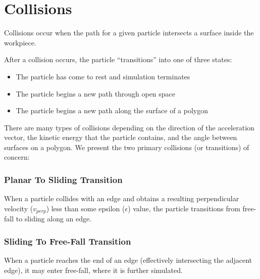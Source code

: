 	\section{Collisions}

Collisions occur when the path for a given particle intersects a surface inside the workpiece.


After a collision occurs, the particle ``transitions'' into one of three states:

\begin{itemize}
\item The particle has come to rest and simulation terminates
\item The particle begins a new path through open space
\item The particle begins a new path along the surface of a polygon
\end{itemize}

There are many types of collisions depending on the direction of the acceleration vector, the kinetic energy that the particle contains, and the angle between surfaces on a polygon. We present the two primary collisions (or transitions) of concern:

		\subsubsection{Planar To Sliding Transition}

When a particle collides with an edge and obtains a resulting perpendicular velocity ($v_{perp}$) less than some epsilon ($\epsilon$) value, the particle transitions from free-fall to sliding along an edge.




		\subsubsection{Sliding To Free-Fall Transition}

When a particle reaches the end of an edge (effectively intersecting the adjacent edge), it may enter free-fall, where it is further simulated.



